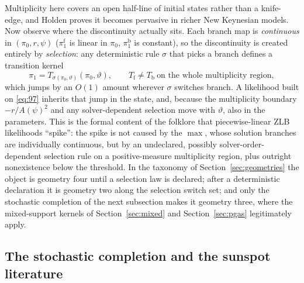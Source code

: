 \documentclass[11pt]{article}
\begin{document}
Multiplicity here covers an open half-line of
initial states rather than a knife-edge, and Holden proves it becomes pervasive in richer New Keynesian
models. Now observe where the discontinuity actually sits. Each branch map is
\emph{continuous} in $(\pi_0,r,\psi)$ ($\pi_1^{\mathrm f}$ is linear in
$\pi_0$, $\pi_1^{\mathrm b}$ is constant), so the discontinuity is created
entirely by \emph{selection}: any deterministic rule $\sigma$ that picks a
branch defines a transition kernel
\begin{equation}\label{eq:97}
 \pi_1=T_{\sigma(\pi_0,\vartheta)}(\pi_0,\vartheta),
 \qquad
 T_{\mathrm f}\neq T_{\mathrm b}\ \text{on the whole multiplicity region},
\end{equation}
which jumps by an $O(1)$ amount wherever $\sigma$ switches branch. A
likelihood built on \eqref{eq:97} inherits that jump in the state, and,
because the multiplicity boundary $-r/A(\psi)^{2}$ and any solver-dependent
selection move with $\vartheta$, also in the parameters. This is the formal
content of the folklore that piecewise-linear ZLB likelihoods ``spike'': the
spike is not caused by the $\max$, whose solution branches are individually
continuous, but by an undeclared, possibly solver-order-dependent selection
rule on a positive-measure multiplicity region, plus outright nonexistence
below the threshold. In the taxonomy of Section~\ref{sec:geometries} the object is
geometry four until a selection law is declared; after a deterministic
declaration it is geometry two along the selection switch set; and only the
stochastic completion of the next subsection makes it geometry three, where
the mixed-support kernels of Section~\ref{sec:mixed} and Section~\ref{sec:pgas} legitimately
apply.

\subsection{The stochastic completion and the sunspot literature}
\label{sec:nk-sunspot}
\end{document}
